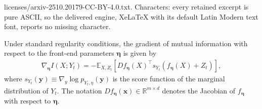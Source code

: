 \documentclass[10pt,a4paper]{amsart}
\newcommand{\E}{\mathbb{E}}
\newcommand{\R}{\mathbb{R}}
\newcommand{\Yt}{Y_t}
\newcommand{\sYt}{s_{\Yt}}
\begin{document}
licenses/arxiv-2510.20179-CC-BY-4.0.txt. Characters: every retained excerpt is pure ASCII, so the delivered engine, XeLaTeX with its default Latin Modern text font, reports no missing character.
\begin{proposition}
\label{prop:info_gradient}
Under standard regularity conditions, the gradient of mutual information 
with respect to the front-end parameters $\bm \eta$ is given by
\begin{align}
\nabla_{\bm \eta} I(X; \Yt) = -\E_{X,Z_t}\left[D f_{\bm \eta}(X)^\top \sYt(f_{\bm \eta}(X) + Z_t)\right],
\label{eq:gradient_formula}
\end{align}
where $\sYt(\bm y) \equiv \nabla_y \log p_{\Yt,\eta}(\bm y)$ 
is the score function of the marginal distribution of $\Yt$.
The notation $D f_{\bm \eta}(\bm x) \in \R^{m \times d}$ denotes 
the Jacobian of $f_{\bm \eta}$ with respect to $\bm \eta$.
\end{proposition}
\end{document}
